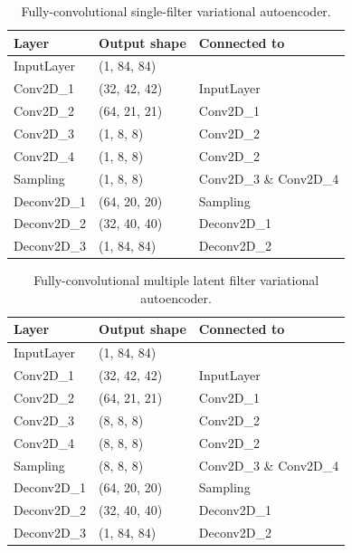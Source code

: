 \begin{table}[]
\centering
\begin{tabular}{@{}lll@{}}
\toprule
\textbf{Layer} & \textbf{Output shape} & \textbf{Connected to}  \\ \midrule
InputLayer     & (1, 84, 84)           &                        \\
Conv2D\_1      & (32, 42, 42)          & InputLayer             \\
Conv2D\_2      & (64, 21, 21)          & Conv2D\_1              \\
Conv2D\_3      & (1, 8, 8)             & Conv2D\_2              \\
Conv2D\_4      & (1, 8, 8)             & Conv2D\_2              \\
Sampling       & (1, 8, 8)             & Conv2D\_3 \& Conv2D\_4 \\
Deconv2D\_1    & (64, 20, 20)          & Sampling               \\
Deconv2D\_2    & (32, 40, 40)          & Deconv2D\_1            \\
Deconv2D\_3    & (1, 84, 84)           & Deconv2D\_2           
\end{tabular}
\caption{Fully-convolutional single-filter variational autoencoder.}
\label{tab:fully_convolutional_single_filter}
\end{table}


\begin{table}[]
\centering
\begin{tabular}{@{}lll@{}}
\toprule
\textbf{Layer} & \textbf{Output shape} & \textbf{Connected to}  \\ \midrule
InputLayer     & (1, 84, 84)           &                        \\
Conv2D\_1      & (32, 42, 42)          & InputLayer             \\
Conv2D\_2      & (64, 21, 21)          & Conv2D\_1              \\
Conv2D\_3      & (8, 8, 8)             & Conv2D\_2              \\
Conv2D\_4      & (8, 8, 8)             & Conv2D\_2              \\
Sampling       & (8, 8, 8)             & Conv2D\_3 \& Conv2D\_4 \\
Deconv2D\_1    & (64, 20, 20)          & Sampling               \\
Deconv2D\_2    & (32, 40, 40)          & Deconv2D\_1            \\
Deconv2D\_3    & (1, 84, 84)           & Deconv2D\_2           
\end{tabular}
\caption{Fully-convolutional multiple latent filter variational autoencoder.}
\label{tab:fully_convolutional_multiple_filter}
\end{table}


